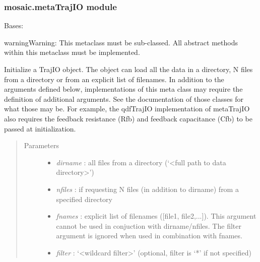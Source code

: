 \documentclass[letterpaper,10pt,english]{sphinxmanual}
\begin{document}
\subsubsection{mosaic.metaTrajIO module}
\label{api-doc/mosaic.meta:mosaic-metatrajio-module}

\begin{fulllineitems}
\label{api-doc/mosaic.meta:mosaic.metaTrajIO.metaTrajIO}
Bases: \href{http://docs.python.org/library/functions.html\#object}{}

\begin{notice}{warning}{Warning:}
This metaclass must be sub-classed. All abstract methods within this metaclass must be implemented.
\end{notice}

Initialize a TrajIO object. The object can load all the data in a directory,
N files from a directory or from an explicit list of filenames. In addition 
to the arguments defined below, implementations of this meta class may require 
the definition of additional arguments. See the documentation of those classes
for what those may be. For example, the qdfTrajIO implementation of metaTrajIO also requires
the feedback resistance (Rfb) and feedback capacitance (Cfb) to be passed at initialization.
\begin{quote}\begin{description}
\item[{Parameters}] \leavevmode\begin{itemize}
\item {} 
\emph{dirname} :           all files from a directory (`\textless{}full path to data directory\textgreater{}')

\item {} 
\emph{nfiles} :            if requesting N files (in addition to dirname) from a specified directory

\item {} 
\emph{fnames} :            explicit list of filenames ({[}file1, file2,...{]}). This argument cannot be used in conjuction with dirname/nfiles. The filter argument is ignored when used in combination with fnames.

\item {} 
\emph{filter} :            `\textless{}wildcard filter\textgreater{}' (optional, filter is `*' if not specified)


\end{itemize}
\end{description}
\end{quote}
\end{fulllineitems}
\end{document}
